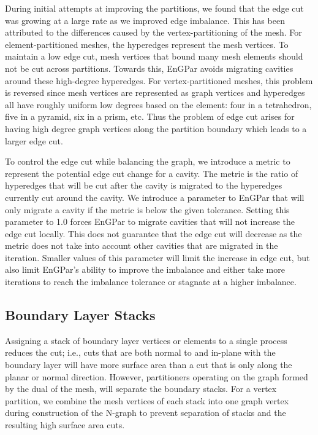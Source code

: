 \documentclass[conference]{IEEEtran}
\begin{document}
During initial attempts at improving the partitions, we found that the edge cut was growing
at a large rate as we improved edge imbalance. This has been attributed to the differences
caused by the vertex-partitioning of the mesh. For element-partitioned meshes, the hyperedges
represent the mesh vertices. To maintain a low edge cut, mesh vertices that bound many mesh
elements should not be cut across partitions. Towards this, EnGPar avoids migrating cavities
around these high-degree hyperedges. For vertex-partitioned meshes, this problem is reversed
since mesh vertices are represented as graph vertices and hyperedges all have roughly uniform
low degrees based on the element: four in a tetrahedron, five in a pyramid, six in a prism, etc.
Thus the problem of edge cut arises for having high degree graph vertices along the partition
boundary which leads to a larger edge cut.

To control the edge cut while balancing the graph, we introduce a metric to represent the
potential edge cut change for a cavity. The metric is the ratio of hyperedges that will be cut
after the cavity is migrated to the hyperedges currently cut around the cavity. We introduce a
parameter to EnGPar that will only migrate a cavity if the metric is below the given tolerance.
Setting this parameter to 1.0 forces EnGPar to migrate cavities that will not increase the edge
cut locally. This does not guarantee that the edge cut will decrease as the metric does not take
into account other cavities that are migrated in the iteration. Smaller values of this
parameter will limit the increase in edge cut, but also limit EnGPar's ability to improve the
imbalance and either take more iterations to reach the imbalance tolerance or stagnate at a
higher imbalance.

\subsection{Boundary Layer Stacks}

Assigning a stack of boundary layer vertices or
elements to a single process reduces the cut; i.e., cuts that are both normal to
and in-plane with the boundary layer will have more surface area than a cut that
is only along the planar or normal direction.
However, partitioners
operating on the graph formed by the dual of the mesh, will separate
the boundary stacks. For a vertex partition, we combine the mesh vertices of each stack into one graph vertex
during construction of the N-graph to prevent separation of stacks and the
resulting high surface area cuts. 
\end{document}
